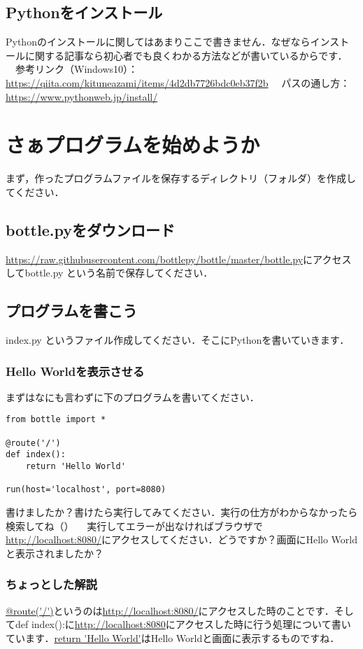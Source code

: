 \documentclass{jsarticle}
\begin{document}
\subsection{Pythonをインストール}
Pythonのインストールに関してはあまりここで書きません．なぜならインストールに関する記事なら初心者でも良くわかる方法などが書いているからです．\newline
　参考リンク（Windows10）：\url{https://qiita.com/kituneazami/items/4d2db7726bdc0eb37f2b} \newline
　パスの通し方：\url{https://www.pythonweb.jp/install/} 


\section{さぁプログラムを始めようか} 
まず，作ったプログラムファイルを保存するディレクトリ（フォルダ）を作成してください．

\subsection{bottle.pyをダウンロード} 
\url{https://raw.githubusercontent.com/bottlepy/bottle/master/bottle.py}にアクセスして\newline bottle.py という名前で保存してください．

\subsection{プログラムを書こう} 
index.py というファイル作成してください．そこにPythonを書いていきます．
\subsubsection{Hello Worldを表示させる} 
まずはなにも言わずに下のプログラムを書いてください．
\begin{lstlisting}[basicstyle=\ttfamily\footnotesize, frame=single]
from bottle import *  

@route('/')
def index():
	return 'Hello World'

run(host='localhost', port=8080)
\end{lstlisting}
書けましたか？書けたら実行してみてください．実行の仕方がわからなかったら検索してね（）\newline
　実行してエラーが出なければブラウザで\url{http://localhost:8080/}にアクセスしてください．どうですか？画面にHello Worldと表示されましたか？\newline

\subsubsection{ちょっとした解説}
\url{@route('/')}というのは\url{http://localhost:8080/}にアクセスした時のことです．そしてdef index():に\url{http://localhost:8080}にアクセスした時に行う処理について書いています．\url{return 'Hello World'}はHello Worldと画面に表示するものですね．
\end{document}
